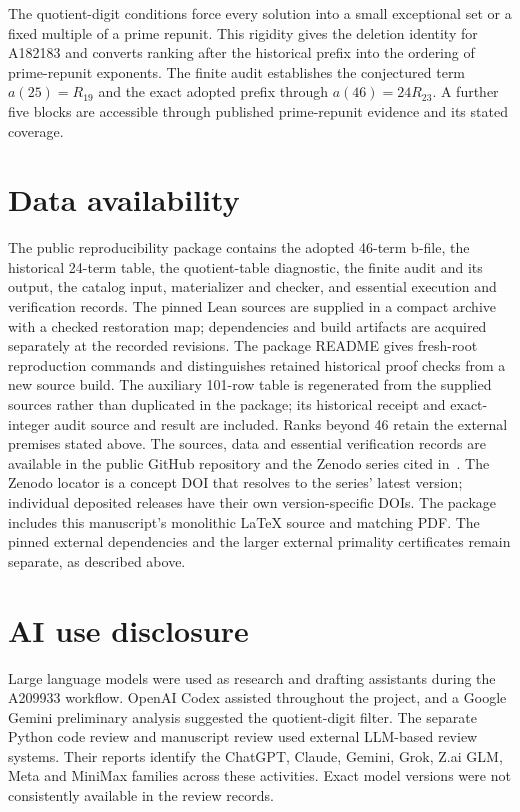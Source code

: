 \documentclass[11pt]{article}
\begin{document}
The quotient-digit conditions force every solution into a small
exceptional set or a fixed multiple of a prime repunit. This rigidity
gives the deletion identity for A182183 and converts ranking after
the historical prefix into the ordering of prime-repunit exponents.
The finite audit establishes the conjectured term \(a(25)=R_{19}\)
and the exact adopted prefix through \(a(46)=24R_{23}\). A further
five blocks are accessible through published prime-repunit evidence
and its stated coverage.

\section*{Data availability}

The public reproducibility package contains the adopted 46-term b-file,
the historical 24-term table, the quotient-table diagnostic, the finite
audit and its output, the catalog input, materializer and checker,
and essential execution and verification records. The pinned Lean
sources are supplied in a compact archive with a checked restoration
map; dependencies and build artifacts are acquired separately at the
recorded revisions. The package README gives fresh-root reproduction
commands and distinguishes retained historical proof checks from a
new source build. The auxiliary 101-row table is regenerated from
the supplied sources rather than duplicated in the package; its
historical receipt and exact-integer audit source and result are included.
Ranks beyond 46 retain the external premises stated above.
The sources, data and essential verification records are available in the
public GitHub repository and the Zenodo series cited in~\cite{project}.
The Zenodo locator is a concept DOI that resolves to the series' latest version;
individual deposited releases have their own version-specific DOIs.
The package includes this manuscript's monolithic LaTeX source and matching
PDF. The pinned external dependencies and the larger external primality
certificates remain separate, as described above.

\section*{AI use disclosure}

Large language models were used as research and drafting assistants
during the A209933 workflow. OpenAI Codex assisted throughout the
project, and a Google Gemini preliminary analysis suggested the
quotient-digit filter. The separate Python code review and manuscript
review used external LLM-based review systems. Their reports identify
the ChatGPT, Claude, Gemini, Grok, Z.ai GLM, Meta and MiniMax
families across these activities. Exact model versions were not
consistently available in the review records.
\end{document}
